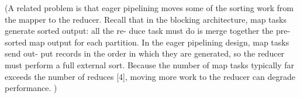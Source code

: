 
{\color{gray}(A related problem is that eager pipelining moves some of the
sorting work from the mapper to the reducer.
Recall that in the
blocking architecture, map tasks generate sorted output: all the re-
duce task must do is merge together the pre-sorted map output for
each partition. In the eager pipelining design, map tasks send out-
put records in the order in which they are generated, so the reducer
must perform a full external sort. Because the number of map tasks
typically far exceeds the number of reduces [4], moving more work
to the reducer can degrade performance.
)}




